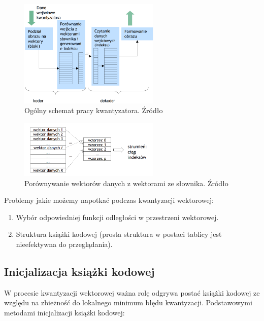\documentclass{article}
\begin{document}
\begin{figure}[H]
    \centering
    \includegraphics[width=0.6\textwidth]{images/schemat_kwantyzatora.png}
    \caption{Ogólny schemat pracy kwantyzatora. Źródło \cite{mwilczewski}}
    \label{fig:crossing}
\end{figure}

\begin{figure}[H]
    \centering
    \includegraphics[width=0.6\textwidth]{images/wektory_danych.png}
    \caption{Porównywanie wektorów danych z wektorami ze słownika. Źródło \cite{mwilczewski}}
    \label{fig:crossing}
\end{figure}

Problemy jakie możemy napotkać podczas kwantyzacji wektorowej:
\begin{enumerate}
  \item Wybór odpowiedniej funkcji odległości w przestrzeni wektorowej.  
  \item Struktura książki kodowej (prosta struktura w postaci tablicy jest nieefektywna do przeglądania).
\end{enumerate}

\subsection{Inicjalizacja książki kodowej}

W procesie kwantyzacji wektorowej ważna rolę odgrywa postać książki kodowej ze względu na zbieżność do lokalnego minimum błędu kwantyzacji. Podstawowymi metodami inicjalizacji książki kodowej:
\end{document}
